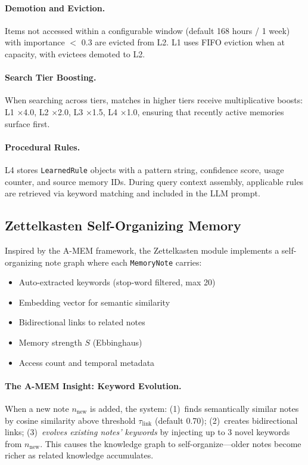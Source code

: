 \documentclass[11pt,a4paper,twocolumn]{article}
\begin{document}
\paragraph{Demotion and Eviction.} Items not accessed within a
configurable window (default 168 hours / 1 week) with importance
$<$ 0.3 are evicted from L2. L1 uses FIFO eviction when at capacity,
with evictees demoted to L2.

\paragraph{Search Tier Boosting.} When searching across tiers,
matches in higher tiers receive multiplicative boosts: L1 $\times$4.0,
L2 $\times$2.0, L3 $\times$1.5, L4 $\times$1.0, ensuring that
recently active memories surface first.

\paragraph{Procedural Rules.} L4 stores \texttt{LearnedRule} objects
with a pattern string, confidence score, usage counter, and source
memory IDs. During query context assembly, applicable rules are
retrieved via keyword matching and included in the LLM prompt.

\subsection{Zettelkasten Self-Organizing Memory}

Inspired by the A-MEM framework, the Zettelkasten module implements
a self-organizing note graph where each \texttt{MemoryNote} carries:

\begin{itemize}[leftmargin=*]
  \item Auto-extracted keywords (stop-word filtered, max 20)
  \item Embedding vector for semantic similarity
  \item Bidirectional links to related notes
  \item Memory strength $S$ (Ebbinghaus)
  \item Access count and temporal metadata
\end{itemize}

\paragraph{The A-MEM Insight: Keyword Evolution.}
When a new note $n_\text{new}$ is added, the system:
(1)~finds semantically similar notes by cosine similarity above
threshold $\tau_\text{link}$ (default 0.70);
(2)~creates bidirectional links;
(3)~\emph{evolves existing notes' keywords} by injecting up to 3
novel keywords from $n_\text{new}$. This causes the knowledge graph
to self-organize---older notes become richer as related knowledge
accumulates.
\end{document}

